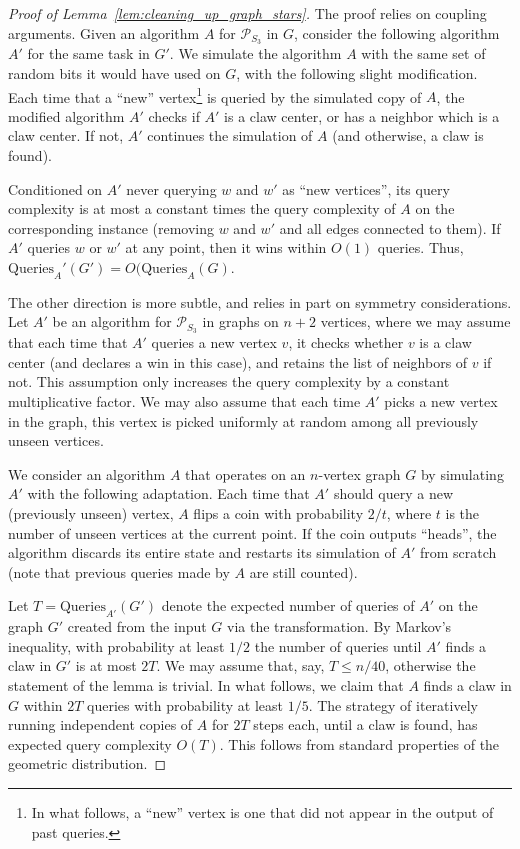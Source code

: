 \documentclass[11pt]{article}
\numberwithin{equation}{section}
\newcommand{\Query}{\text{Queries}}
\renewcommand{\P}{\mathcal{P}}
\newcommand{\1}{\mathbf{1}}
\begin{document}
\begin{proof}[Proof of Lemma~\ref{lem:cleaning_up_graph_stars}]
The proof relies on coupling arguments. 
Given an algorithm $A$ for $\P_{S_3}$ in $G$, consider the following algorithm $A'$ for the same task in $G'$. We simulate the algorithm $A$ with the same set of random bits it would have used on $G$, with the following slight modification. Each time that a ``new'' vertex\footnote{In what follows, a ``new'' vertex is one that did not appear in the output of past queries.} is queried by the simulated copy of $A$, the modified algorithm $A'$ checks if $A'$ is a claw center, or has a neighbor which is a claw center. If not, $A'$ continues the simulation of $A$ (and otherwise, a claw is found).

Conditioned on $A'$ never querying $w$ and $w'$ as ``new vertices'', its query complexity is at most a constant times the query complexity of $A$ on the corresponding instance (removing $w$ and $w'$ and all edges connected to them). If $A'$ queries $w$ or $w'$ at any point, then it wins within $O(1)$ queries. Thus, $\Query_A'(G') = O(\Query_A(G)$.

The other direction is more subtle, and relies in part on symmetry considerations. 
Let $A'$ be an algorithm for $\P_{S_3}$ in graphs on $n+2$ vertices, where we may assume that each time that $A'$ queries a new vertex $v$, it checks whether $v$ is a claw center (and declares a win in this case), and retains the list of neighbors of $v$ if not. This assumption only increases the query complexity by a constant multiplicative factor. We may also assume that each time $A'$ picks a new vertex in the graph, this vertex is picked uniformly at random among all previously unseen vertices.

We consider an algorithm $A$ that operates on an $n$-vertex graph $G$ by simulating $A'$ with the following adaptation. Each time that $A'$ should query a new (previously unseen) vertex, $A$ flips a coin with probability $2/t$, where $t$ is the number of unseen vertices at the current point. If the coin outputs ``heads'', the algorithm discards its entire state and restarts its simulation of $A'$ from scratch (note that previous queries made by $A$ are still counted). 

Let $T = \text{Queries}_{A'}(G')$ denote the expected number of queries of $A'$ on the graph $G'$ created from the input $G$ via the transformation. By Markov's inequality, with probability at least $1/2$ the number of queries until $A'$ finds a claw in $G'$ is at most $2T$. We may assume that, say, $T \leq n/40$, otherwise the statement of the lemma is trivial. In what follows, we claim that $A$ finds a claw in $G$ within $2T$ queries with probability at least $1/5$. The strategy of iteratively running independent copies of $A$ for $2T$ steps each, until a claw is found, has expected query complexity $O(T)$. 
This follows from standard properties of the geometric distribution. 


\end{proof}
\end{document}
